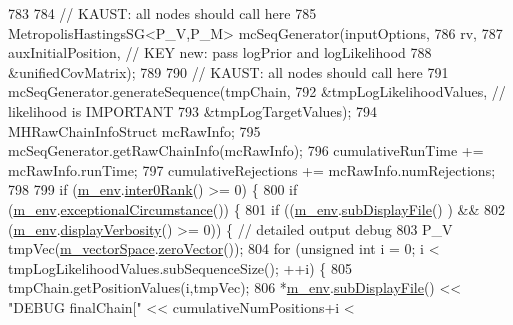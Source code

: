 \begin{DoxyCode}
783 
784     \textcolor{comment}{// KAUST: all nodes should call here}
785     MetropolisHastingsSG<P\_V,P\_M> mcSeqGenerator(inputOptions,
786                                                         rv,
787                                                         auxInitialPosition, \textcolor{comment}{// KEY new: pass logPrior and
       logLikelihood}
788                                                         &unifiedCovMatrix);
789 
790     \textcolor{comment}{// KAUST: all nodes should call here}
791     mcSeqGenerator.generateSequence(tmpChain,
792                                     &tmpLogLikelihoodValues, \textcolor{comment}{// likelihood is IMPORTANT}
793                                     &tmpLogTargetValues);
794     MHRawChainInfoStruct mcRawInfo;
795     mcSeqGenerator.getRawChainInfo(mcRawInfo);
796     cumulativeRunTime    += mcRawInfo.runTime;
797     cumulativeRejections += mcRawInfo.numRejections;
798 
799     \textcolor{keywordflow}{if} (\hyperlink{class_q_u_e_s_o_1_1_m_l_sampling_a13f1ca4fe9f94822fe572a743eaced1d}{m\_env}.\hyperlink{class_q_u_e_s_o_1_1_base_environment_ae106b5bb8a80b655b88b3a26b1e7c185}{inter0Rank}() >= 0) \{
800       \textcolor{keywordflow}{if} (\hyperlink{class_q_u_e_s_o_1_1_m_l_sampling_a13f1ca4fe9f94822fe572a743eaced1d}{m\_env}.\hyperlink{class_q_u_e_s_o_1_1_base_environment_af0bc451b18302cfd5ee747c321e1c6e5}{exceptionalCircumstance}()) \{
801         \textcolor{keywordflow}{if} ((\hyperlink{class_q_u_e_s_o_1_1_m_l_sampling_a13f1ca4fe9f94822fe572a743eaced1d}{m\_env}.\hyperlink{class_q_u_e_s_o_1_1_base_environment_a8a0064746ae8dddfece4229b9ad374d6}{subDisplayFile}()       ) &&
802             (\hyperlink{class_q_u_e_s_o_1_1_m_l_sampling_a13f1ca4fe9f94822fe572a743eaced1d}{m\_env}.\hyperlink{class_q_u_e_s_o_1_1_base_environment_a1fe5f244fc0316a0ab3e37463f108b96}{displayVerbosity}() >= 0)) \{ \textcolor{comment}{// detailed output debug}
803           P\_V tmpVec(\hyperlink{class_q_u_e_s_o_1_1_m_l_sampling_a7bc4c72f65ba9166ed94a6e198b0915b}{m\_vectorSpace}.\hyperlink{class_q_u_e_s_o_1_1_vector_space_a92e963bb5cab3eecd290dfe4b8f03b04}{zeroVector}());
804           \textcolor{keywordflow}{for} (\textcolor{keywordtype}{unsigned} \textcolor{keywordtype}{int} i = 0; i < tmpLogLikelihoodValues.subSequenceSize(); ++i) \{
805             tmpChain.getPositionValues(i,tmpVec);
806             *\hyperlink{class_q_u_e_s_o_1_1_m_l_sampling_a13f1ca4fe9f94822fe572a743eaced1d}{m\_env}.\hyperlink{class_q_u_e_s_o_1_1_base_environment_a8a0064746ae8dddfece4229b9ad374d6}{subDisplayFile}() << \textcolor{stringliteral}{"DEBUG finalChain["} << cumulativeNumPositions+i <

\end{DoxyCode}
